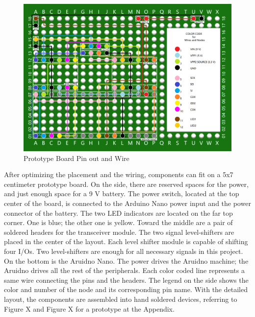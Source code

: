 \begin{figure}[ht]
\centering
\includegraphics[width=14cm]{figures/clean_prototype_board.png}
\caption{Prototype Board Pin out and Wire}
\label{fig:prototype_board}
\end{figure}

After optimizing the placement and the wiring, components can fit on a 5x7 centimeter prototype board. On the side, there are reserved spaces for the power, and just enough space for a 9 V battery. The power switch, located at the top center of the board, is connected to the Arduino Nano power input and the power connector of the battery. The two LED indicators are located on the far top corner. One is blue; the other one is yellow. Toward the middle are a pair of soldered headers for the transceiver module. The two signal level-shifters are placed in the center of the layout. Each level shifter module is capable of shifting four I/Os. Two level-shifters are enough for all necessary signals in this project. On the bottom is the Aruidno Nano. The power drives the Aruidno machine; the Aruidno drives all the rest of the peripherals. Each color coded line represents a same wire connecting the pins and the headers. The legend on the side shows the color and number of the node and its corresponding pin name. With the detailed layout, the components are assembled into hand soldered devices, referring to Figure X and Figure X for a prototype at the Appendix.

